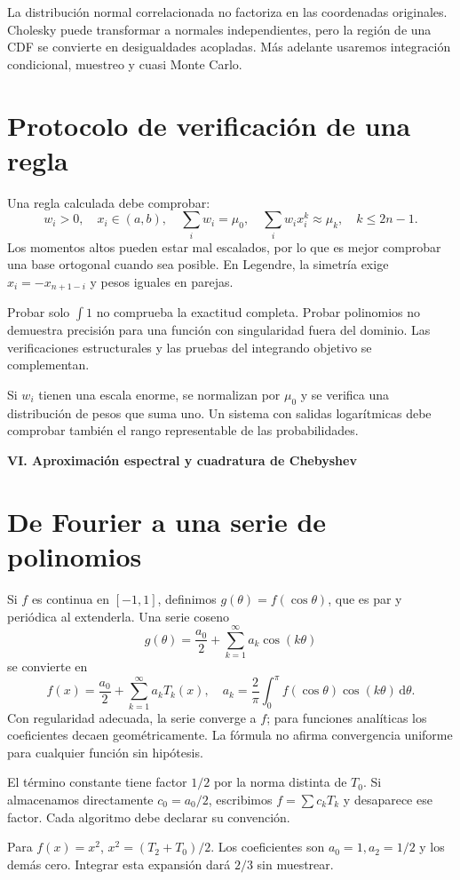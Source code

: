 \documentclass[11pt,a4paper]{article}
\newcommand{\dd}{\,\mathrm d}
\theoremstyle{definition}
\newcommand{\parte}[1]{\par\bigskip\Needspace{8\baselineskip}\begin{center}{\Large\bfseries\color{azul}#1}\end{center}}
\begin{document}
La distribución normal correlacionada no factoriza en las coordenadas originales. Cholesky puede transformar a normales independientes, pero la región de una CDF se convierte en desigualdades acopladas. Más adelante usaremos integración condicional, muestreo y cuasi Monte Carlo.

\section{Protocolo de verificación de una regla}
Una regla calculada debe comprobar:
\[
w_i>0,\quad x_i\in(a,b),\quad
\sum_iw_i=\mu_0,\quad
\sum_iw_ix_i^k\approx\mu_k,\quad k\le2n-1.
\]
Los momentos altos pueden estar mal escalados, por lo que es mejor comprobar una base ortogonal cuando sea posible. En Legendre, la simetría exige $x_i=-x_{n+1-i}$ y pesos iguales en parejas.

Probar solo $\int1$ no comprueba la exactitud completa. Probar polinomios no demuestra precisión para una función con singularidad fuera del dominio. Las verificaciones estructurales y las pruebas del integrando objetivo se complementan.

Si $w_i$ tienen una escala enorme, se normalizan por $\mu_0$ y se verifica una distribución de pesos que suma uno. Un sistema con salidas logarítmicas debe comprobar también el rango representable de las probabilidades.


\parte{VI. Aproximación espectral y cuadratura de Chebyshev}
\section{De Fourier a una serie de polinomios}
Si $f$ es continua en $[-1,1]$, definimos $g(\theta)=f(\cos\theta)$, que es par y periódica al extenderla. Una serie coseno
\[
g(\theta)=\frac{a_0}2+\sum_{k=1}^\infty a_k\cos(k\theta)
\]
se convierte en
\[
f(x)=\frac{a_0}2+\sum_{k=1}^\infty a_kT_k(x),\quad
a_k=\frac2\pi\int_0^\pi f(\cos\theta)\cos(k\theta)\dd\theta.
\]
Con regularidad adecuada, la serie converge a $f$; para funciones analíticas los coeficientes decaen geométricamente. La fórmula no afirma convergencia uniforme para cualquier función sin hipótesis.

El término constante tiene factor $1/2$ por la norma distinta de $T_0$. Si almacenamos directamente $c_0=a_0/2$, escribimos $f=\sum c_kT_k$ y desaparece ese factor. Cada algoritmo debe declarar su convención.

Para $f(x)=x^2$, $x^2=(T_2+T_0)/2$. Los coeficientes son $a_0=1,a_2=1/2$ y los demás cero. Integrar esta expansión dará $2/3$ sin muestrear.
\end{document}
